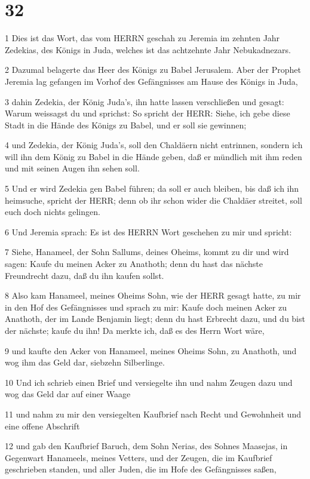 \chapter{32}

\par 1 Dies ist das Wort, das vom HERRN geschah zu Jeremia im zehnten Jahr Zedekias, des Königs in Juda, welches ist das achtzehnte Jahr Nebukadnezars.
\par 2 Dazumal belagerte das Heer des Königs zu Babel Jerusalem. Aber der Prophet Jeremia lag gefangen im Vorhof des Gefängnisses am Hause des Königs in Juda,
\par 3 dahin Zedekia, der König Juda's, ihn hatte lassen verschließen und gesagt: Warum weissagst du und sprichst: So spricht der HERR: Siehe, ich gebe diese Stadt in die Hände des Königs zu Babel, und er soll sie gewinnen;
\par 4 und Zedekia, der König Juda's, soll den Chaldäern nicht entrinnen, sondern ich will ihn dem König zu Babel in die Hände geben, daß er mündlich mit ihm reden und mit seinen Augen ihn sehen soll.
\par 5 Und er wird Zedekia gen Babel führen; da soll er auch bleiben, bis daß ich ihn heimsuche, spricht der HERR; denn ob ihr schon wider die Chaldäer streitet, soll euch doch nichts gelingen.
\par 6 Und Jeremia sprach: Es ist des HERRN Wort geschehen zu mir und spricht:
\par 7 Siehe, Hanameel, der Sohn Sallums, deines Oheims, kommt zu dir und wird sagen: Kaufe du meinen Acker zu Anathoth; denn du hast das nächste Freundrecht dazu, daß du ihn kaufen sollst.
\par 8 Also kam Hanameel, meines Oheims Sohn, wie der HERR gesagt hatte, zu mir in den Hof des Gefängnisses und sprach zu mir: Kaufe doch meinen Acker zu Anathoth, der im Lande Benjamin liegt; denn du hast Erbrecht dazu, und du bist der nächste; kaufe du ihn! Da merkte ich, daß es des Herrn Wort wäre,
\par 9 und kaufte den Acker von Hanameel, meines Oheims Sohn, zu Anathoth, und wog ihm das Geld dar, siebzehn Silberlinge.
\par 10 Und ich schrieb einen Brief und versiegelte ihn und nahm Zeugen dazu und wog das Geld dar auf einer Waage
\par 11 und nahm zu mir den versiegelten Kaufbrief nach Recht und Gewohnheit und eine offene Abschrift
\par 12 und gab den Kaufbrief Baruch, dem Sohn Nerias, des Sohnes Maasejas, in Gegenwart Hanameels, meines Vetters, und der Zeugen, die im Kaufbrief geschrieben standen, und aller Juden, die im Hofe des Gefängnisses saßen,
